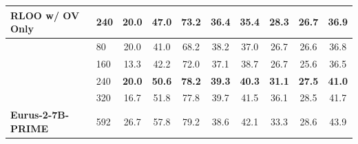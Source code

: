 \begin{table}[t]
{\begin{tabular}{llcccccccc}
\textbf{RLOO w/ OV Only}         & \cellcolor[HTML]{D7E8E8}240 & \cellcolor[HTML]{D7E8E8}\textbf{20.0}  & \cellcolor[HTML]{D7E8E8}47.0          & \cellcolor[HTML]{D7E8E8}73.2          & \cellcolor[HTML]{D7E8E8}36.4              & \cellcolor[HTML]{D7E8E8}35.4               & \cellcolor[HTML]{D7E8E8}28.3          & \cellcolor[HTML]{D7E8E8}26.7               & \cellcolor[HTML]{D7E8E8}36.9          \\ \midrule
                                 & 80                          & 20.0                                   & 41.0                                  & 68.2                                  & 38.2                                      & 37.0                                       & 26.7                                  & 26.6                                       & 36.8                                  \\
                                 & 160                         & 13.3                                   & 42.2                                  & 72.0                                  & 37.1                                      & 38.7                                       & 26.7                                  & 25.6                                       & 36.5                                  \\
                                 & \cellcolor[HTML]{D7E8E8}240 & \cellcolor[HTML]{D7E8E8}\textbf{20.0}  & \cellcolor[HTML]{D7E8E8}\textbf{50.6} & \cellcolor[HTML]{D7E8E8}\textbf{78.2} & \cellcolor[HTML]{D7E8E8}\textbf{39.3}     & \cellcolor[HTML]{D7E8E8}\textbf{40.3}      & \cellcolor[HTML]{D7E8E8}\textbf{31.1} & \cellcolor[HTML]{D7E8E8}\textbf{27.5}      & \cellcolor[HTML]{D7E8E8}\textbf{41.0} \\
                                 & 320                         & 16.7                                   & 51.8                                  & 77.8                                  & 39.7                                      & 41.5                                       & 36.1                                  & 28.5                                       & 41.7                                  \\
\multirow{-5}{*}{\textbf{Eurus-2-7B-PRIME}} & 592                         & 26.7                                   & 57.8                                  & 79.2                                  & 38.6                                      & 42.1                                       & 33.3                                  & 28.6                                       & 43.9                                  \\ \bottomrule
\end{tabular}
}
\end{table}